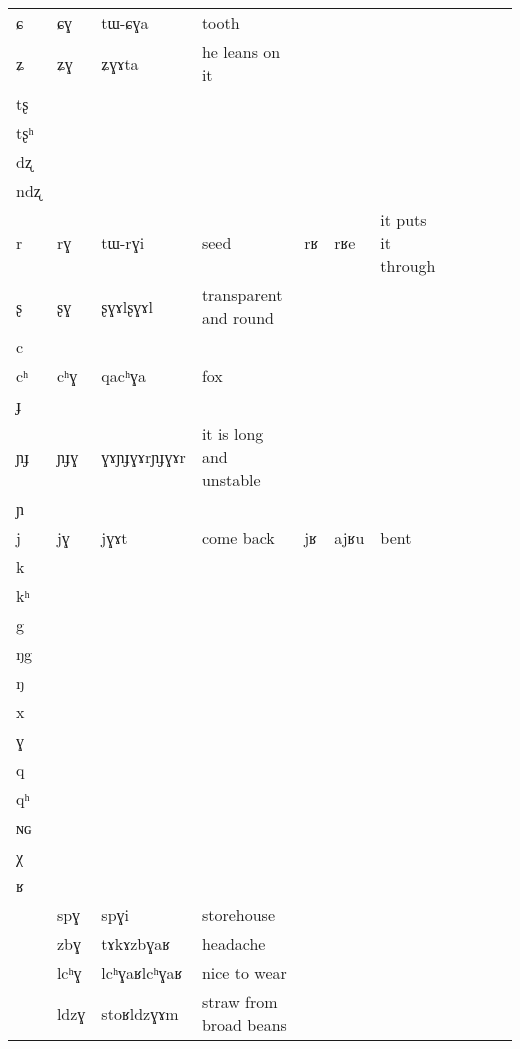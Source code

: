 \documentclass[oldfontcommands,oneside,a4paper,11pt]{article}
\newcommand{\ipa}[1]{{\phon #1}} %
\newcommand{\idph}[1]{\cellcolor{gray}\textbf{#1}}
\begin{document}
\begin{table}
{\begin{tabular}{l|lll|lll|lll|l}
\ipa{ɕ}  &  	\ipa{ɕɣ}  &  	\ipa{tɯ-ɕɣa}  &  tooth	&	&	& \\
\ipa{ʑ}  &  	\ipa{ʑɣ}  &  	\ipa{ʑɣɤta}  & he leans on it 	&	&	& \\
\ipa{tʂ}  &  	  &  	  &  	&	&	& \\
\ipa{tʂʰ}  &  	  &  	  &  	&	&	& \\
\ipa{dʐ}  &  	  &  	  &  	&	&	& \\
\ipa{ndʐ}  &  	  &  	  &  	&	&	& \\
\ipa{r}  &  	\ipa{rɣ}  &  	\ipa{tɯ-rɣi}  &  seed	&\ipa{rʁ}	&\ipa{rʁe}& it puts it through\\
\ipa{ʂ}  &  	\ipa{ʂɣ} \idph{} &  	\ipa{ʂɣɤlʂɣɤl}  & transparent and round	&	&	& \\
\ipa{c}  &  	  &  	  &  	&	&	& \\
\ipa{cʰ}  &  	\ipa{cʰɣ}  &  	\ipa{qacʰɣa}  &fox  	&	&	& \\
\ipa{ɟ}  &  	  &  	  &  	&	&	& \\
\ipa{ɲɟ}  &  	\ipa{ɲɟɣ} \idph{} &  	\ipa{ɣɤɲɟɣɤrɲɟɣɤr}  &  it is long and unstable	&	&	& \\
\ipa{ɲ}  &  	  &  	  &  	&	&	& \\
\ipa{j}  &  	\ipa{jɣ}  &  	\ipa{jɣɤt}  &come back  	&\ipa{jʁ}	&\ipa{ajʁu}	&bent \\
\ipa{k}  &  	  &  	  &  	&	&	& \\
\ipa{kʰ}  &  	  &  	  &  	&	&	& \\
\ipa{g}  &  	  &  	  &  	&	&	& \\
\ipa{ŋg}  &  	  &  	  &  	&	&	& \\
\ipa{ŋ}  &  	  &  	  &  	&	&	& \\
\ipa{x}  &  	  &  	  &  	&	&	& \\
\ipa{ɣ}  &  	  &  	  &  	&	&	& \\
\ipa{q}  &  	  &  	  &  	&	&	& \\
\ipa{qʰ}  &  	  &  	  &  	&	&	& \\
\ipa{ɴɢ}  &  	  &  	  &  	&	&	& \\
\ipa{χ}  &  	  &  	  &  	&	&	& \\
\ipa{ʁ}  &  	  &  	  &  	&	&	& \\
\midrule
&	\ipa{spɣ }  &	\ipa{spɣi}  &storehouse	&&&\\	
&	\ipa{zbɣ}  &	\ipa{tɤkɤzbɣaʁ}  &headache	&&&\\	
\midrule
&	\ipa{lcʰɣ} \idph{} &	\ipa{lcʰɣaʁlcʰɣaʁ }  &	nice to wear&&&\\	
&	\ipa{ldzɣ}  &	\ipa{stoʁldzɣɤm}  &	straw from broad beans &&&\\	

\end{tabular}}
\end{table}
\end{document}
